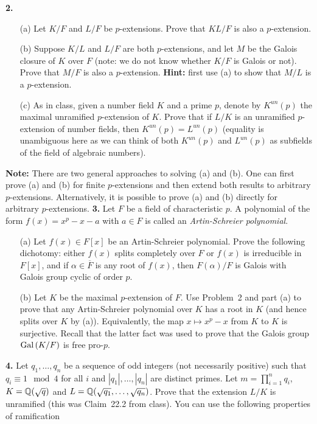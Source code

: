 \documentclass[12pt]{amsart}
\begin{document}
{\bf 2.}
\begin{itemize}
\item[(a)] Let $K/F$ and $L/F$ be $p$-extensions. Prove
that $KL/F$ is also a $p$-extension.

\item[(b)] Suppose $K/L$ and $L/F$ are both $p$-extensions, and
let $M$ be the Galois closure of $K$ over $F$ (note: we do
not know whether $K/F$ is Galois or not). Prove that
$M/F$ is also a $p$-extension. {\bf Hint:} first use (a) to show that
$M/L$ is a $p$-extension.

\item[(c)] As in class, given a number field $K$ and a prime $p$, denote by $K^{un}(p)$ the maximal unramified $p$-extension of $K$.
Prove that if $L/K$ is an unramified $p$-extension of number fields, then $K^{un}(p)=L^{un}(p)$ (equality is unambiguous here as
we can think of both $K^{un}(p)$ and $L^{un}(p)$ as subfields of the field of algebraic numbers).
\end{itemize}
{\bf Note:} There are two general approaches to solving (a) and (b). One can first prove (a) and (b) for finite $p$-extensions and then
extend both results to arbitrary $p$-extensions. Alternatively, it is possible to prove (a) and (b) directly for arbitrary $p$-extensions.
\skv
{\bf 3.} Let $F$ be a field of characteristic $p$. A polynomial of the form $f(x)=x^p-x-a$ with $a\in F$ is called an
{\it Artin-Schreier polynomial}.
\begin{itemize}
\item[(a)] Let $f(x)\in F[x]$ be an Artin-Schreier polynomial. Prove the following dichotomy: either $f(x)$ splits completely over $F$ or
$f(x)$ is irreducible in $F[x]$, and if $\alpha\in \overline F$ is any root of $f(x)$, then $F(\alpha)/F$ is Galois with Galois
group cyclic of order $p$.
\item[(b)] Let $K$ be the maximal $p$-extension of $F$. Use Problem~2 and part (a) to prove that any Artin-Schreier polynomial over $K$
has a root in $K$ (and hence splits over $K$ by (a)). Equivalently, the map $x\mapsto x^p-x$ from $K$ to $K$ is surjective. Recall
that the latter fact was used to prove that the Galois group ${\rm Gal\,}(K/F)$ is free pro-$p$.
\end{itemize}
\skv
{\bf 4.} Let $q_1,\ldots, q_n$ be a sequence of odd integers (not necessarily positive) such that $q_i\equiv 1\mod 4$ for all $i$
and $|q_1|,\ldots, |q_n|$ are distinct primes. Let $m=\prod_{i=1}^n q_i$, $K={\mathbb Q}(\sqrt{q})$ and $L={\mathbb Q}(\sqrt{q_1},\ldots,\sqrt{q_n})$.
Prove that the extension $L/K$ is unramified (this was Claim~22.2 from class). You can use the following properties of ramification
\end{document}
